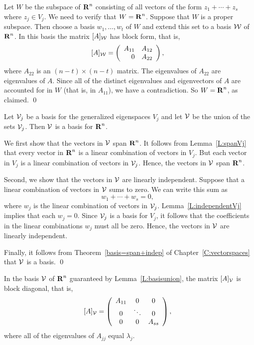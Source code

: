 \proof  Let $W$ be the subspace
of $\mbox{$\bf{R}$}^n$ consisting of all vectors of the form $z_1+\cdots +z_s$ where 
$z_j\in V_j$.  We need to verify that $W=\mbox{$\bf{R}$}^n$.  Suppose that $W$ is a 
proper subspace.  Then choose a basis $w_1,\ldots,w_t$ of $W$ and extend
this set to a basis ${\cal W}$ of $\mbox{$\bf{R}$}^n$.  In this basis the matrix
$[A]_{\cal W}$ has block form, that is,
\[
[A]_{\cal W} = \left(\begin{array}{rr} A_{11} & A_{12}\\ 0 &A_{22}\end{array}\right),
\]
where $A_{22}$ is an $(n-t)\times(n-t)$ matrix.  The eigenvalues of $A_{22}$ 
are eigenvalues of $A$.  Since all of the distinct eigenvalues and 
eigenvectors of $A$ are accounted for in $W$ (that is, in $A_{11}$), we have 
a contradiction.  So $W=\mbox{$\bf{R}$}^n$, as claimed.  \qed

\begin{lemma}  \label{L:basisunion}
Let ${\cal V}_j$ be a basis for the generalized eigenspaces $V_j$ and let 
${\cal V}$ be the union of the sets ${\cal V}_j$.  Then ${\cal V}$ is a basis
for $\mbox{$\bf{R}$}^n$.
\end{lemma}

\proof  We first show that the vectors in ${\cal V}$ span $\mbox{$\bf{R}$}^n$.  It follows 
from Lemma~\ref{L:spanVj} that every vector in $\mbox{$\bf{R}$}^n$ is a linear combination
of vectors in $V_j$.  But each vector in $V_j$ is a linear combination of
vectors in ${\cal V}_j$.  Hence, the vectors in ${\cal V}$ span $\mbox{$\bf{R}$}^n$.

Second, we show that the vectors in ${\cal V}$ are linearly independent. 
Suppose that a linear combination of vectors in ${\cal V}$ sums to zero.  
We can write this sum as 
\[
w_1 + \cdots + w_s = 0,
\]
where $w_j$ is the linear combination of vectors in ${\cal V}_j$. 
Lemma~\ref{L:independentVj} implies that each $w_j=0$.  Since ${\cal V}_j$ is
a basis for $V_j$, it follows that the coefficients in the linear
combinations $w_j$ must all be zero.  Hence, the vectors in ${\cal V}$ are 
linearly independent.

Finally, it follows from Theorem~\ref{basis=span+indep} of 
Chapter~\ref{C:vectorspaces} that ${\cal V}$ is a basis.  \qed

\begin{lemma} \label{L:diagVj}
In the basis ${\cal V}$ of $\mbox{$\bf{R}$}^n$ guaranteed by Lemma~\ref{L:basisunion}, the 
matrix $[A]_{\cal V}$ is block diagonal, that is,
\[
[A]_{\cal V} = \left(\begin{array}{ccc} A_{11} & 0 & 0  \\ 0 & \ddots & 0 \\
0 & 0 & A_{ss} \end{array}\right),
\]
where all of the eigenvalues of $A_{jj}$ equal $\lambda_j$.
\end{lemma}

